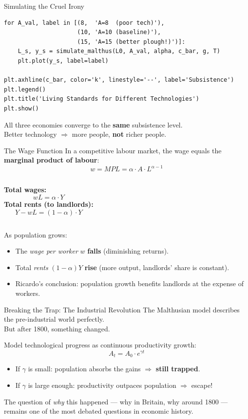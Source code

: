 \documentclass[aspectratio=169, 10pt]{beamer}
\begin{document}
\begin{frame}[fragile]{Simulating the Cruel Irony}
\begin{lstlisting}
for A_val, label in [(8,  'A=8  (poor tech)'),
                     (10, 'A=10 (baseline)'),
                     (15, 'A=15 (better plough!)')]:
    L_s, y_s = simulate_malthus(L0, A_val, alpha, c_bar, g, T)
    plt.plot(y_s, label=label)

plt.axhline(c_bar, color='k', linestyle='--', label='Subsistence')
plt.legend()
plt.title('Living Standards for Different Technologies')
plt.show()
\end{lstlisting}
\vspace{0.3em}
All three economies converge to the \textbf{same} subsistence level.\\
Better technology $\Rightarrow$ more people, \textbf{not} richer people.
\end{frame}

\begin{frame}{The Wage Function}
In a competitive labour market, the wage equals the
\textbf{marginal product of labour}:
\[
  w = MPL = \alpha \cdot A \cdot L^{\alpha - 1}
\]
\begin{columns}[T]
\textbf{Total wages:}
\[ wL = \alpha \cdot Y \]
\textbf{Total rents (to landlords):}
\[ Y - wL = (1 - \alpha) \cdot Y \]
\end{columns}
\vspace{0.5em}
As population grows:
\begin{itemize}
  \item The \textit{wage per worker} $w$ \textbf{falls}
        (diminishing returns).
  \item Total \textit{rents} $(1-\alpha)Y$ \textbf{rise}
        (more output, landlords' share is constant).
  \item Ricardo's conclusion: population growth benefits
        \alert{landlords} at the expense of \alert{workers}.
\end{itemize}
\end{frame}

\begin{frame}{Breaking the Trap: The Industrial Revolution}
The Malthusian model describes the pre-industrial world perfectly.\\
But after 1800, something changed.
\vspace{0.5em}

Model technological progress as continuous productivity growth:
\[
  A_t = A_0 \cdot e^{\gamma t}
\]
\begin{itemize}
  \item If $\gamma$ is small: population absorbs the gains $\Rightarrow$
        \textbf{still trapped}.
  \item If $\gamma$ is large enough: productivity outpaces population
        $\Rightarrow$ \alert{escape!}
\end{itemize}
\vspace{0.5em}
The question of \textit{why} this happened --- why in Britain,
why around 1800 --- remains one of the most debated questions
in economic history.
\end{frame}
\end{document}
